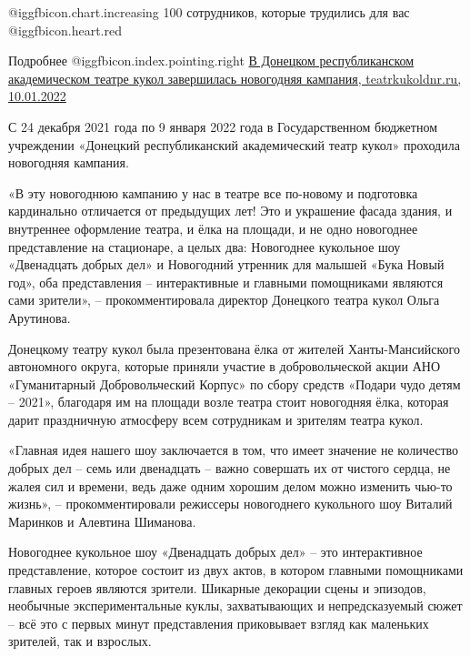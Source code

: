  @igg{fbicon.chart.increasing}  100 сотрудников, которые трудились для вас @igg{fbicon.heart.red}


Подробнее  @igg{fbicon.index.pointing.right}  
\href{https://teatrkukoldnr.ru/novosti/217-zakritie-ngkampanii-9-yanvarya}{%
В Донецком республиканском академическом театре кукол завершилась новогодняя кампания, %
teatrkukoldnr.ru, 10.01.2022%
}

С 24 декабря 2021 года по 9 января 2022 года в Государственном бюджетном
учреждении «Донецкий республиканский академический театр кукол» проходила
новогодняя кампания.


«В эту новогоднюю кампанию у нас в театре все по-новому и подготовка
кардинально отличается от предыдущих лет! Это и украшение фасада здания, и
внутреннее оформление театра, и ёлка на площади, и не одно новогоднее
представление на стационаре, а целых два: Новогоднее кукольное шоу «Двенадцать
добрых дел» и Новогодний утренник для малышей «Бука Новый год», оба
представления – интерактивные и главными помощниками являются сами зрители», –
прокомментировала директор Донецкого театра кукол Ольга Арутинова.


Донецкому театру кукол была презентована ёлка от жителей Ханты-Мансийского
автономного округа, которые приняли участие в добровольческой акции АНО
«Гуманитарный Добровольческий Корпус» по сбору средств «Подари чудо детям –
2021», благодаря им на площади возле театра стоит новогодняя ёлка, которая
дарит праздничную атмосферу всем сотрудникам и зрителям театра кукол.


«Главная идея нашего шоу заключается в том, что имеет значение не количество
добрых дел – семь или двенадцать – важно совершать их от чистого сердца, не
жалея сил и времени, ведь даже одним хорошим делом можно изменить чью-то
жизнь», – прокомментировали режиссеры новогоднего кукольного шоу Виталий
Маринков и Алевтина Шиманова.


Новогоднее кукольное шоу «Двенадцать добрых дел» – это интерактивное
представление, которое состоит из двух актов, в котором главными помощниками
главных героев являются зрители. Шикарные декорации сцены и эпизодов, необычные
экспериментальные куклы, захватывающих и непредсказуемый сюжет – всё это с
первых минут представления приковывает взгляд как маленьких зрителей, так и
взрослых.

